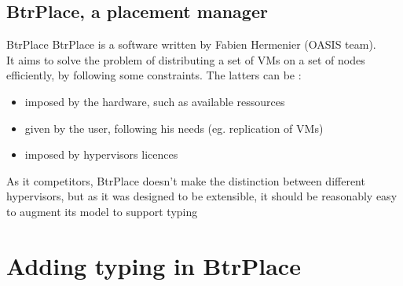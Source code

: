 \documentclass{beamer}
\begin{document}
\subsection{BtrPlace, a placement manager}
\begin{frame}{BtrPlace}
BtrPlace is a software written  by Fabien Hermenier (OASIS team).\\
\pause It aims to solve the problem of distributing a set of VMs on
a set of nodes efficiently, by following some constraints. The latters
can be :
\begin{itemize}
	\item imposed by the hardware, such as available ressources
	\item given by the user, following his needs (eg. replication
		of VMs)
	\item imposed by hypervisors licences
\end{itemize}
\pause As it competitors, BtrPlace doesn't make the distinction
between different hypervisors, but as it was designed to be extensible,
it should be reasonably easy to augment its model to support typing
\end{frame}
\section{Adding typing in BtrPlace}
\end{document}
